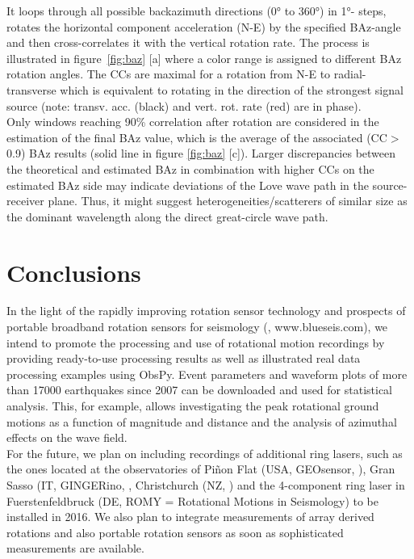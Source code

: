 \documentclass[12pt,reqno,letter]{article}
\begin{document}
It loops through all possible backazimuth directions (0° to 360°) in 1°- steps, rotates the horizontal component acceleration (N-E) by the specified BAz-angle and then cross-correlates it with the vertical rotation rate. The process is illustrated in figure~\ref{fig:baz} [a] where a color range is assigned to different BAz rotation angles.  The CCs are maximal for a rotation from N-E to radial-transverse which is equivalent to rotating in the direction of the strongest signal source (note: transv. acc. (black) and vert. rot. rate (red) are in phase).\\ 
Only windows reaching 90\% correlation after rotation are considered in the estimation of the final BAz value, which is the average of the associated (CC$>$0.9) BAz results (solid line in figure \ref{fig:baz} [c]). 
Larger discrepancies between the theoretical and estimated BAz in combination with higher CCs on the estimated BAz side may indicate deviations of the Love wave path in the source-receiver plane. Thus, it might suggest heterogeneities/scatterers of similar size as the dominant wavelength along the direct great-circle wave path.\\
%
%
\section*{Conclusions}
In the light of the rapidly improving rotation sensor technology and prospects of portable broadband rotation sensors for seismology (\cite{Bernauer2016}, www.blueseis.com), we intend to promote the processing and use of rotational motion recordings by providing  ready-to-use processing results as well as illustrated real data processing examples using ObsPy. Event parameters and waveform plots of more than 17000 earthquakes since 2007 can be downloaded and used for statistical analysis. This, for example, allows investigating the peak rotational ground motions as a function of magnitude and distance and the analysis of azimuthal effects on the wave field.\\
For the future, we plan on including recordings of additional ring lasers, such as the ones located at the observatories of Pi\~{n}on Flat (USA, GEOsensor, \cite{Schreiber2003b}), Gran Sasso (IT, GINGERino, \cite{Ortolan2016}, Christchurch (NZ, \cite{Schreiber2003}) and the 4-component ring laser in Fuerstenfeldbruck (DE, ROMY = Rotational Motions in Seismology) to be installed in 2016. We also plan to integrate measurements of array derived rotations and also portable rotation sensors as soon as sophisticated measurements are available.
\end{document}
